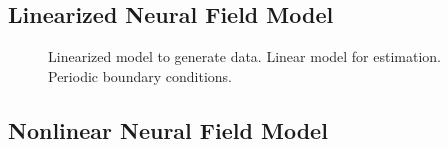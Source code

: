 \documentclass[conference,onecolumn]{IEEEtran}
\begin{document}
\subsection{Linearized Neural Field Model}

\begin{figure}[htbp]
	\centering
	\caption{Linearized model to generate data. Linear model for estimation. Periodic boundary conditions.}
	\label{fig:label}
\end{figure}

\subsection{Nonlinear Neural Field Model}
\end{document}
